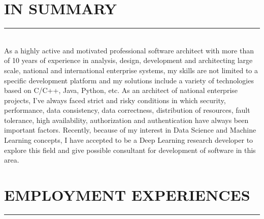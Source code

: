 \documentclass[10pt,a4paper]{article}
\begin{document}
\thispagestyle{fancy}

\section{IN SUMMARY}
\noindent \rule {3.5cm}{0.4pt} \\
As a highly active and motivated professional software architect with more than of 10 years of experience in analysis, design, development and architecting large scale, national and international enterprise systems, my skills are not limited to a specific development platform and my solutions include a variety of technologies based on C/C++, Java, Python, etc. As an architect of national enterprise projects, I've always faced strict and risky conditions in which security, performance, data consistency, data correctness, distribution of resources, fault tolerance, high availability, authorization and authentication have always been important factors. Recently, because of my interest in Data Science and Machine Learning concepts, I have accepted to be a Deep Learning research developer to explore this field and give possible consultant for development of software in this area.

\section{EMPLOYMENT EXPERIENCES}
\noindent \rule {7.3cm}{0.4pt}
\end{document}
